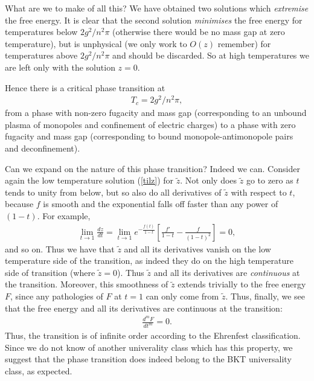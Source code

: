 \documentclass[a4paper,a4paper]{article}
\begin{document}
What are we to make of all this? We have obtained two solutions which \emph{extremise} the free energy. 
It is clear that the second solution \emph{minimises} the free energy for temperatures below $2 g^2/n^2\pi$
(otherwise there would be no mass gap at zero temperature), but is unphysical (we only work to $O(z)$ remember)
for temperatures above $2 g^2/n^2\pi$ and should be discarded. So at high temperatures we are left only with the solution $z=0$.

Hence there is a critical phase transition at 
\begin{gather} \label{T_c}
T_c = 2 g^2/n^2\pi, 
\end{gather}
from a phase with non-zero fugacity and mass gap
(corresponding to an unbound plasma of monopoles and confinement of electric charges)
 to a phase with zero fugacity and mass gap
(corresponding to bound monopole-antimonopole pairs and deconfinement). 

Can we expand on the nature of this phase transition? Indeed we can. Consider again the low temperature solution (\ref{tilz})
for $\tilde{z}$. Not only does $\tilde{z}$ go to zero as $t$ tends to unity from below, but so also do all derivatives
of $\tilde{z}$ with respect to $t$, because $f$ is smooth and the exponential falls off faster than any power of $(1-t)$. For example,
\begin{gather}
\lim_{t \rightarrow 1} \frac{dz}{dt} = \lim_{t \rightarrow 1} e^{- \frac{f(t)}{1-t}} \left[ \frac{f'}{1-t} - \frac{f}{(1-t)^2} \right] = 0,
\end{gather}
and so on.
Thus we have that $\tilde{z}$ and all its derivatives vanish on the low temperature side of the transition,
as indeed they do on the high temperature side of transition (where $\tilde{z}=0$).
Thus $\tilde{z}$ and all its derivatives are \emph{continuous} at the transition.
Moreover,
this smoothness of $\tilde{z}$ extends trivially to the free energy $F$, since any pathologies
of $F$ at $t=1$ can only come from $\tilde{z}$. Thus, finally, we see that the free energy and all its derivatives
are continuous at the transition:
\begin{gather} \label{cont}
\frac{d^m F}{d t^m} = 0.
\end{gather}
Thus, the transition is of infinite order according
to the Ehrenfest classification. Since we do not know of another univerality class which has this property, we
suggest that the phase transition does indeed belong to the BKT universality class, as expected.
%
\end{document}
